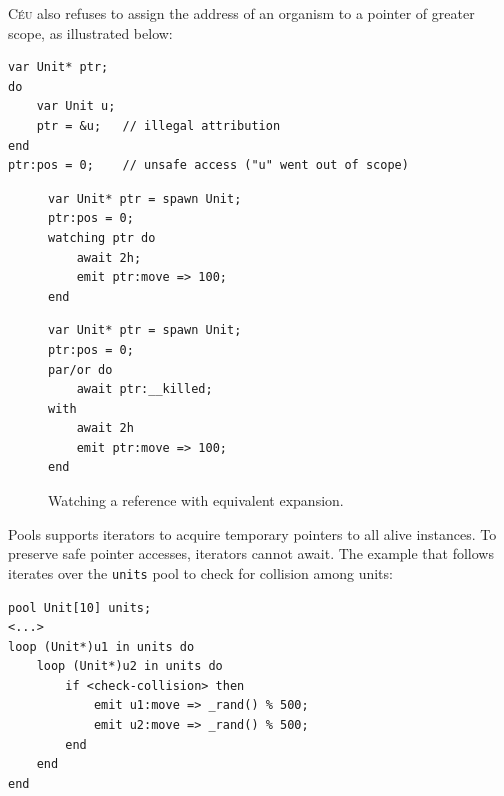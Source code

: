 \documentclass{sigplanconf}
\newcommand{\CEU}{\textsc{C\'{e}u}\xspace}
\newcommand{\code}[1] {{\small{\texttt{#1}}}}
\newcommand{\1}{\;}
\newcommand{\2}{\;\;}
\newcommand{\3}{\;\;\;}
\newcommand{\5}{\;\;\;\;\;}
\begin{document}
\CEU also refuses to assign the address of an organism to a pointer of greater 
scope, as illustrated below:

\begin{lstlisting}
var Unit* ptr;
do
    var Unit u;
    ptr = &u;   // illegal attribution
end
ptr:pos = 0;    // unsafe access ("u" went out of scope)
\end{lstlisting}

\begin{figure}[t]
\begin{minipage}[t]{0.48\linewidth}
\begin{lstlisting}
var Unit* ptr = spawn Unit;
ptr:pos = 0;
watching ptr do
    await 2h;
    emit ptr:move => 100;
end
\end{lstlisting}
\end{minipage}
%
\begin{minipage}[t]{0.48\linewidth}
\begin{lstlisting}
var Unit* ptr = spawn Unit;
ptr:pos = 0;
par/or do
    await ptr:__killed;
with
    await 2h
    emit ptr:move => 100;
end
\end{lstlisting}
\end{minipage}
\caption{ Watching a reference with equivalent expansion.
\label{lst.watching}
}
\end{figure}

Pools supports iterators to acquire temporary pointers to all alive instances.
To preserve safe pointer accesses, iterators cannot await.
The example that follows iterates over the \code{units} pool to check for 
collision among units:


\begin{lstlisting}
pool Unit[10] units;
<...>
loop (Unit*)u1 in units do
    loop (Unit*)u2 in units do
        if <check-collision> then
            emit u1:move => _rand() % 500;
            emit u2:move => _rand() % 500;
        end
    end
end
\end{lstlisting}
\end{document}
